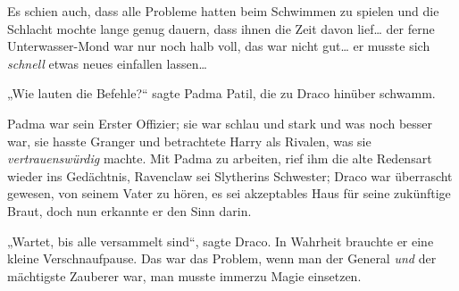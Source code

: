 Es schien auch, dass alle Probleme hatten beim Schwimmen zu spielen und die Schlacht mochte lange genug dauern, dass ihnen die Zeit davon lief… der ferne Unterwasser-Mond war nur noch halb voll, das war nicht gut… er musste sich \emph{schnell} etwas neues einfallen lassen…

„Wie lauten die Befehle?“ sagte Padma Patil, die zu Draco hinüber schwamm.

Padma war sein Erster Offizier; sie war schlau und stark und was noch besser war, sie hasste Granger und betrachtete Harry als Rivalen, was sie \emph{vertrauenswürdig} machte. Mit Padma zu arbeiten, rief ihm die alte Redensart wieder ins Gedächtnis, Ravenclaw sei Slytherins Schwester; Draco war überrascht gewesen, von seinem Vater zu hören, es sei akzeptables Haus für seine zukünftige Braut, doch nun erkannte er den Sinn darin.

„Wartet, bis alle versammelt sind“, sagte Draco. In Wahrheit brauchte er eine kleine Verschnaufpause. Das war das Problem, wenn man der General \emph{und} der mächtigste Zauberer war, man musste immerzu Magie einsetzen.

